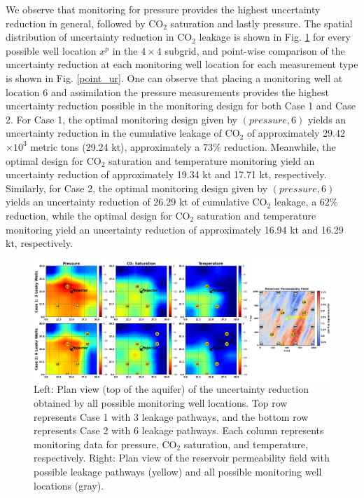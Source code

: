 \documentclass[a4paper,fleqn]{cas-sc}
\begin{document}
We observe that monitoring for pressure provides the highest uncertainty reduction in general, followed by CO$_2$ saturation and lastly pressure. The spatial distribution of uncertainty reduction in CO$_2$ leakage is shown in Fig. \ref{heatmaps} for every possible well location $x^p$ in the $4 \times 4$ subgrid, and point-wise comparison of the uncertainty reduction at each monitoring well location for each measurement type is shown in Fig. \ref{point_ur}. One can observe that placing a monitoring well at location 6 and assimilation the pressure measurements provides the highest uncertainty reduction possible in the monitoring design for both Case 1 and Case 2. For Case 1, the optimal monitoring design given by $(pressure, 6)$ yields an uncertainty reduction in the cumulative leakage of CO$_2$ of approximately 29.42$\times 10^3$ metric tons (29.24 kt), approximately a $73\%$ reduction. Meanwhile, the optimal design for CO$_2$ saturation and temperature monitoring yield an uncertainty reduction of approximately 19.34 kt and 17.71 kt, respectively. Similarly, for Case 2, the optimal monitoring design given by $(pressure, 6)$ yields an uncertainty reduction of 26.29 kt of cumulative CO$_2$ leakage, a $62\%$ reduction, while the optimal design for CO$_2$ saturation and temperature monitoring yield an uncertainty reduction of approximately 16.94 kt and 16.29 kt, respectively.

\begin{figure}
    \centering
    \includegraphics[width=16.5cm]{figs/Figure 10.pdf}
    \caption{Left: Plan view (top of the aquifer) of the uncertainty reduction obtained by all possible monitoring well locations. Top row represents Case 1 with 3 leakage pathways, and the bottom row represents Case 2 with 6 leakage pathways. Each column represents monitoring data for pressure, CO$_2$ saturation, and temperature, respectively. Right: Plan view of the reservoir permeability field with possible leakage pathways (yellow) and all possible monitoring well locations (gray).}
    \label{heatmaps}
\end{figure}
\end{document}
